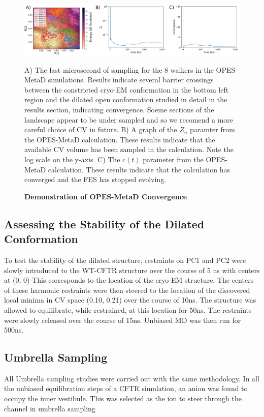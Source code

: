 \begin{figure}
	\begin{center}
		\includegraphics[width=1\textwidth]{figures/opening/FES_mw_trace.pdf}
	\end{center}
	\captionsetup{singlelinecheck = false, justification=raggedright}
	\caption[Demonstration of OPES-MetaD Convergence ] {\textbf{Demonstration of OPES-MetaD Convergence}}{A) The last microsecond of sampling for the 8 walkers in the OPES-MetaD simulations. Results indicate several barrier crossings between the constricted cryo-EM conformation in the bottom left region and the dilated open conformation studied in detail in the results section, indicating convergence. Soeme sections of the landscape appear to be under sampled and so we recomend a more careful choice of CV in future. B) A graph of the $Z_n$ paramter from the OPES-MetaD calculation. These results indicate that the available CV volume has been sampled in the calculation. Note the log scale on the y-axis. C) The $c(t)$ parameter from the OPES-MetaD calculation. These results indicate that the calculation has converged and the FES has stopped evolving. }
	\label{convergence_3}
\end{figure}

\subsection{Assessing the Stability of the Dilated Conformation}
To test the stability of the dilated structure, restraints on PC1 and PC2 were slowly introduced to the WT-CFTR structure over the course of 5 ns with centers at (0, 0)-This corresponds to the location of the cryo-EM structure. The centers of these harmonic restraints were then steered to the location of the discovered local minima in CV space (0.10, 0.21) over the course of 10ns. The structure was allowed to equilibrate, while restrained, at this location for 50ns. The restraints were slowly released over the course of 15ns. Unbiased MD was then run for 500ns.

\subsection{Umbrella Sampling}
All Umbrella sampling studies were carried out with the same methodology. In all the unbiased equilibration steps of a CFTR simulation, an anion was found to occupy the inner vestibule. This was selected as the ion to steer through the channel in umbrella sampling

